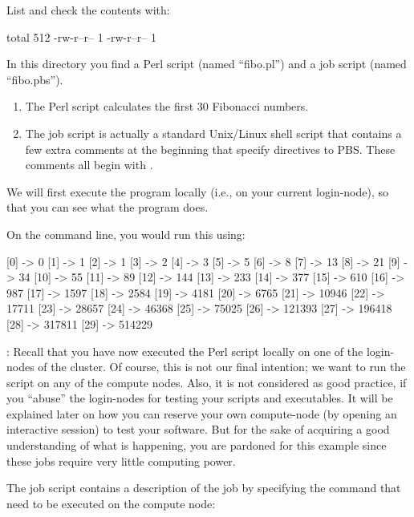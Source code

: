 List and check the contents with:

\begin{prompt}
total 512
-rw-r--r-- 1 %
-rw-r--r-- 1 %
\end{prompt}

In this directory you find a Perl script (named ``fibo.pl'') and a job script
(named ``fibo.pbs'').

\begin{enumerate}
\item  The Perl script calculates the first 30 Fibonacci numbers.
\item  The job script is actually a standard Unix/Linux shell script that
  contains a few extra comments at the beginning that specify directives to
  PBS.  These comments all begin with .
\end{enumerate}

We will first execute the program locally (i.e., on your current login-node),
so that you can see what the program does.

On the command line, you would run this using:

\begin{prompt}
[0] -> 0
[1] -> 1
[2] -> 1
[3] -> 2
[4] -> 3
[5] -> 5
[6] -> 8
[7] -> 13
[8] -> 21
[9] -> 34
[10] -> 55
[11] -> 89
[12] -> 144
[13] -> 233
[14] -> 377
[15] -> 610
[16] -> 987
[17] -> 1597
[18] -> 2584
[19] -> 4181
[20] -> 6765
[21] -> 10946
[22] -> 17711
[23] -> 28657
[24] -> 46368
[25] -> 75025
[26] -> 121393
[27] -> 196418
[28] -> 317811
[29] -> 514229
\end{prompt}

: Recall that you have now executed the Perl script locally on
one of the login-nodes of the \hpc cluster.  Of course, this is not our final
intention; we want to run the script on any of the compute nodes. Also, it is
not considered as good practice, if you ``abuse'' the login-nodes for testing
your scripts and executables. It will be explained later on how you can
reserve your own compute-node (by opening an interactive session) to test
your software. But for the sake of acquiring a good understanding of what is
happening, you are pardoned for this example since these jobs require very little
computing power.

The job script contains a description of the job by specifying the command that
need to be executed on the compute node:

